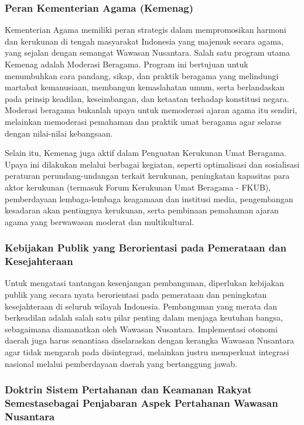 \documentclass[12pt, a4paper]{article}
\begin{document}
\subsubsection*{Peran Kementerian Agama (Kemenag)}

Kementerian Agama memiliki peran strategis dalam mempromosikan harmoni dan kerukunan di tengah masyarakat Indonesia yang majemuk secara agama, yang sejalan dengan semangat Wawasan Nusantara. Salah satu program utama Kemenag adalah Moderasi Beragama. Program ini bertujuan untuk menumbuhkan cara pandang, sikap, dan praktik beragama yang melindungi martabat kemanusiaan, membangun kemaslahatan umum, serta berlandaskan pada prinsip keadilan, keseimbangan, dan ketaatan terhadap konstitusi negara. Moderasi beragama bukanlah upaya untuk memoderasi ajaran agama itu sendiri, melainkan memoderasi pemahaman dan praktik umat beragama agar selaras dengan nilai-nilai kebangsaan.  

Selain itu, Kemenag juga aktif dalam Penguatan Kerukunan Umat Beragama. Upaya ini dilakukan melalui berbagai kegiatan, seperti optimalisasi dan sosialisasi peraturan perundang-undangan terkait kerukunan, peningkatan kapasitas para aktor kerukunan (termasuk Forum Kerukunan Umat Beragama - FKUB), pemberdayaan lembaga-lembaga keagamaan dan institusi media, pengembangan kesadaran akan pentingnya kerukunan, serta pembinaan pemahaman ajaran agama yang berwawasan moderat dan multikultural.  

\subsubsection*{Kebijakan Publik yang Berorientasi pada Pemerataan dan Kesejahteraan}

Untuk mengatasi tantangan kesenjangan pembangunan, diperlukan kebijakan publik yang secara nyata berorientasi pada pemerataan dan peningkatan kesejahteraan di seluruh wilayah Indonesia. Pembangunan yang merata dan berkeadilan adalah salah satu pilar penting dalam menjaga keutuhan bangsa, sebagaimana diamanatkan oleh Wawasan Nusantara. Implementasi otonomi daerah juga harus senantiasa diselaraskan dengan kerangka Wawasan Nusantara agar tidak mengarah pada disintegrasi, melainkan justru memperkuat integrasi nasional melalui pemberdayaan daerah yang bertanggung jawab.  

\subsubsection*{Doktrin Sistem Pertahanan dan Keamanan Rakyat Semestasebagai Penjabaran Aspek Pertahanan Wawasan Nusantara}
\end{document}
